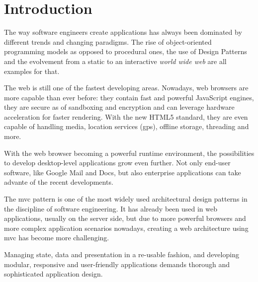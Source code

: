 \chapter{Introduction}
The way software engineers create applications has always been dominated by different trends and changing paradigms. The rise of object-oriented programming models as opposed to procedural ones, the use of Design Patterns and the evolvement from a static to an interactive \emph{world wide web} are all examples for that.

The web is still one of the fastest developing areas. Nowadays, web browsers are more capable than ever before: they contain fast and powerful JavaScript engines, they are secure as of sandboxing and encryption and can leverage hardware acceleration for faster rendering. With the new HTML5 standard, they are even capable of handling media, location services (\acs{gps}), offline storage, threading and more.

With the web browser becoming a powerful runtime environment, the possibilities to develop desktop-level applications grow even further. Not only end-user software, like Google Mail and Docs, but also enterprise applications can take advante of the recent developments.

The \ac{mvc} pattern is one of the most widely used architectural design patterns in the discipline of software engineering. It has already been used in web applications, usually on the server side, but due to more powerful browsers and more complex application scenarios nowadays, creating a web architecture using \ac{mvc} has become more challenging.

Managing state, data and presentation in a re-usable fashion, and developing modular, responsive and user-friendly applications demands thorough and sophisticated application design.



